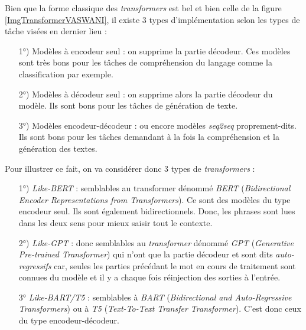 Bien que la forme classique des \textit{transformers} est bel et bien celle de la figure \ref{ImgTransformerVASWANI}, il existe $ 3 $ types d'implémentation selon les types de tâche visées en dernier lieu :
\begin{itemize}
\item[1°)] Modèles à encodeur seul : on supprime la partie décodeur. Ces modèles sont très bons pour les tâches de compréhension du langage comme la classification par exemple.
\item[2°)] Modèles à décodeur seul : on supprime alors la partie décodeur du modèle. Ils sont bons pour les tâches de génération de texte.
\item[3°)] Modèles encodeur-décodeur : ou encore modèles \textit{seq2seq} proprement-dits. Ils sont bons pour les tâches demandant à la fois la compréhension et la génération des textes.
\end{itemize}
Pour illustrer ce fait, on va considérer donc $ 3 $ types de \textit{transformers} \cite{GRAAL_HF_tunstall2022natural, HF_wolf2020transformers} :
\begin{itemize}
\item[1°)] \textit{Like-BERT} : semblables au transformer dénommé \textit{BERT} (\textit{Bidirectional Encoder Re\-pre\-sen\-ta\-tions from Transformers}). Ce sont des modèles du type encodeur seul. Ils sont également bidirectionnels. Donc, les phrases sont lues dans les deux sens pour mieux saisir tout le contexte.
\item[2°)] \textit{Like-GPT} : donc semblables au \textit{transformer} dénommé \textit{GPT} (\textit{Generative Pre-trained Transformer}) qui n'ont que la partie décodeur et sont dits \textit{auto-regressifs} car, seules les parties précédant le mot en cours de traitement sont connues du modèle et il y a chaque fois réinjection des sorties à l'entrée.
\item[3°] \textit{Like-BART/T5} : semblables à \textit{BART} (\textit{Bidirectional and Auto-Regressive Transformers}) ou à  \textit{T5} (\textit{Text-To-Text Transfer Transformer}). C'est donc ceux du type encodeur-décodeur.
\end{itemize}
